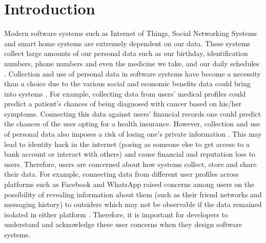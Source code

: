 \documentclass{sigchi}
\begin{document}
 


\section{Introduction} 

Modern software systems such as Internet of Things, Social Networking Systems and smart home systems are extremely dependent on our data. These systems collect large amounts of our personal data such as our birthday, identification numbers, phone numbers and even the medicine we take, and our daily schedules \cite {new2013google, the2017the}. Collection and use of personal data in software systems have become a necessity than a choice due to the various social and economic benefits data could bring into systems  \cite {marr2015big, tene2012big}. For example, collecting data from users' medical profiles could predict a patient's chances of being diagnosed with cancer based on his/her symptoms. Connecting this data against users' financial records one could predict the chances of the user opting for a health insurance. However, collection and use of personal data also imposes a risk of losing one's private information \cite {european2016data}. This may lead to identity hack in the internet (posing as someone else to get access to a bank account or interact with others) and cause financial and reputation loss to users. Therefore, users are concerned about how systems collect, store and share their data. For example, connecting data from different user profiles across platforms such as Facebook and WhatsApp raised concerns among users on the possibility of revealing information about them (such as their friend networks and messaging history) to outsiders which may not be observable if the data remained isolated in either platform \cite {zingales2017between}. Therefore, it is important for developers to understand and acknowledge these user concerns when they design software systems.
\end{document}
